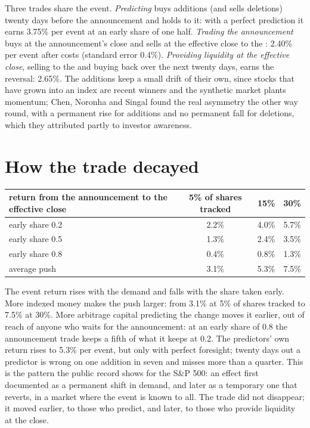Three trades share the event. \emph{Predicting} buys additions (and sells deletions) twenty days before the announcement and holds to it: with a perfect
prediction it earns 3.75\% per event at an early share of one half. \emph{Trading the announcement} buys at the announcement's close and sells at the effective
close to the : 2.40\% per event after costs (standard error 0.4\%). \emph{Providing liquidity at the effective close}, selling to the  and
buying back over the next twenty days, earns the reversal: 2.65\%. The additions keep a small drift of their own, since stocks that have grown into an index
are recent winners and the synthetic market plants momentum; Chen, Noronha and Singal found the real asymmetry the other way round, with a permanent rise
for additions and no permanent fall for deletions, which they attributed partly to investor awareness.

\section{How the trade decayed}

\begin{center}
\small
\begin{tabular}{@{}lccc@{}}
\toprule
return from the announcement to the effective close & 5\% of shares tracked & 15\% & 30\%\\
\midrule
early share 0.2 & 2.2\% & 4.0\% & 5.7\%\\
early share 0.5 & 1.3\% & 2.4\% & 3.5\%\\
early share 0.8 & 0.4\% & 0.8\% & 1.3\%\\
\midrule
average push & 3.1\% & 5.3\% & 7.5\%\\
\bottomrule
\end{tabular}
\end{center}

The event return rises with the demand and falls with the share taken early. More indexed money makes the push larger: from 3.1\% at 5\% of shares tracked to
7.5\% at 30\%. More arbitrage capital predicting the change moves it earlier, out of reach of anyone who waits for the announcement: at an early share of 0.8
the announcement trade keeps a fifth of what it keeps at 0.2. The predictors' own return rises to 5.3\% per event, but only with perfect foresight; twenty
days out a predictor is wrong on one addition in seven and misses more than a quarter. This is the pattern the public record shows for the S\&P 500: an
effect first documented as a permanent shift in demand, and later as a temporary one that reverts, in a market where the event is known to all. The trade
did not disappear; it moved earlier, to those who predict, and later, to those who provide liquidity at the close.

